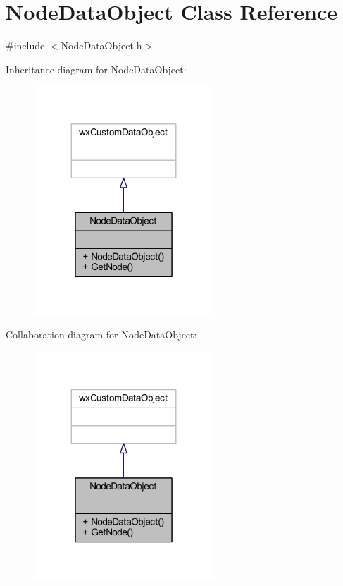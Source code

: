 \hypertarget{class_node_data_object}{}\section{Node\+Data\+Object Class Reference}
\label{class_node_data_object}


{\ttfamily \#include $<$Node\+Data\+Object.\+h$>$}



Inheritance diagram for Node\+Data\+Object\+:
\nopagebreak
\begin{figure}[H]
\begin{center}
\leavevmode
\includegraphics[width=191pt]{class_node_data_object__inherit__graph}
\end{center}
\end{figure}


Collaboration diagram for Node\+Data\+Object\+:
\nopagebreak
\begin{figure}[H]
\begin{center}
\leavevmode
\includegraphics[width=191pt]{class_node_data_object__coll__graph}
\end{center}
\end{figure}
